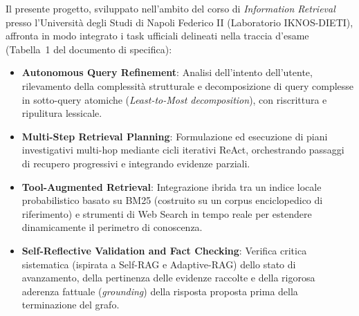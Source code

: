 Il presente progetto, sviluppato nell'ambito del corso di \textit{Information Retrieval} presso l'Università degli Studi di Napoli Federico II (Laboratorio IKNOS-DIETI), affronta in modo integrato i task ufficiali delineati nella traccia d'esame (Tabella~1 del documento di specifica):
\begin{itemize}
    \item \textbf{Autonomous Query Refinement}: Analisi dell'intento dell'utente, rilevamento della complessità strutturale e decomposizione di query complesse in sotto-query atomiche (\textit{Least-to-Most decomposition}), con riscrittura e ripulitura lessicale.
    \item \textbf{Multi-Step Retrieval Planning}: Formulazione ed esecuzione di piani investigativi multi-hop mediante cicli iterativi ReAct, orchestrando passaggi di recupero progressivi e integrando evidenze parziali.
    \item \textbf{Tool-Augmented Retrieval}: Integrazione ibrida tra un indice locale probabilistico basato su BM25 (costruito su un corpus enciclopedico di riferimento) e strumenti di Web Search in tempo reale per estendere dinamicamente il perimetro di conoscenza.
    \item \textbf{Self-Reflective Validation and Fact Checking}: Verifica critica sistematica (ispirata a Self-RAG e Adaptive-RAG) dello stato di avanzamento, della pertinenza delle evidenze raccolte e della rigorosa aderenza fattuale (\textit{grounding}) della risposta proposta prima della terminazione del grafo.
\end{itemize}

